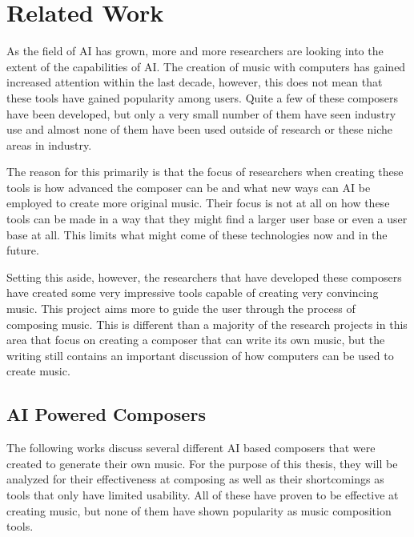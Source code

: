\chapter{Related Work} 
\label{ch:relatedwork}

As the field of AI has grown, more and more researchers are looking into the extent of the capabilities of AI.  The creation of music with computers has gained increased attention within the last decade, however, this does not mean that these tools have gained popularity among users.  Quite a few of these composers have been developed, but only a very small number of them have seen industry use and almost none of them have been used outside of research or these niche areas in industry.

\vspace{\baselineskip}

The reason for this primarily is that the focus of researchers when creating these tools is how advanced the composer can be and what new ways can AI be employed to create more original music.  Their focus is not at all on how these tools can be made in a way that they might find a larger user base or even a user base at all.  This limits what might come of these technologies now and in the future.

\vspace{\baselineskip}

Setting this aside, however, the researchers that have developed these composers have created some very impressive tools capable of creating very convincing music.  This project aims more to guide the user through the process of composing music.  This is different than a majority of the research projects in this area that focus on creating a composer that can write its own music, but the writing still contains an important discussion of how computers can be used to create music.

\section{AI Powered Composers}
\label{sec:aipoweredcomposers}

The following works discuss several different AI based composers that were created to generate their own music.  For the purpose of this thesis, they will be analyzed for their effectiveness at composing as well as their shortcomings as tools that only have limited usability.  All of these have proven to be effective at creating music, but none of them have shown popularity as music composition tools.

